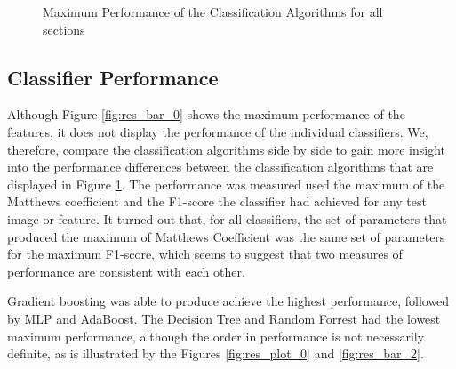 \begin{figure}[]
	\caption{Maximum Performance of the Classification Algorithms for all sections}
	\label{fig:res_bar_1}
\end{figure}

\subsection{Classifier Performance}

Although Figure \ref{fig:res_bar_0} shows the maximum performance of the features, it does not display the performance of the individual classifiers. We, therefore, compare the classification algorithms side by side to gain more insight into the performance differences between the classification algorithms that are displayed in Figure \ref{fig:res_bar_1}. The performance was measured used the maximum of the Matthews coefficient and the F1-score the classifier had achieved for any test image or feature. It turned out that, for all classifiers, the set of parameters that produced the maximum of Matthews Coefficient was the same set of parameters for the maximum F1-score, which seems to suggest that two measures of performance are consistent with each other.

Gradient boosting was able to produce achieve the highest performance, followed by MLP and AdaBoost. The Decision Tree and Random Forrest had the lowest maximum performance, although the order in performance is not necessarily definite, as is illustrated by the Figures \ref{fig:res_plot_0} and \ref{fig:res_bar_2}.

